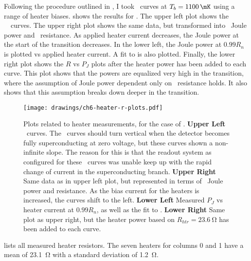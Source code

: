 Following the procedure outlined in , I took \IV\ curves at $T_b = \SI{1100}{\mK}$ using a range of heater biases.
 shows the results for .
The upper left plot shows the \TES\ \IV\ curves.
The upper right plot shows the same data, but transformed into \TES\ Joule power and \TES\ resistance.
As applied heater current decreases, the Joule power at the start of the transition decreases.
In the lower left, the Joule power at $0.99R_{n}$ is plotted vs applied heater current.
A fit to  is also plotted.
Finally, the lower right plot shows the $R$ vs $P_J$ plots after the heater power has been added to each curve.
This plot shows that the powers are equalized very high in the transition, where the assumption of Joule power dependent only on \TES\ resistance holds.
It also shows that this assumption breaks down deeper in the transition.

\begin{figure*}
\texttt{[image: drawings/ch6-heater-r-plots.pdf]}
\caption[Plots related to heater measurements]{
Plots related to heater measurements, for the case of .
\textbf{Upper Left} \IV\ curves. The \IV\ curves should turn vertical when the detector becomes fully superconducting at zero voltage, but these curves shown a non-infinite slope. The reason for this is that the readout system as configured for these \IV\ curves was unable keep up with the rapid change of current in the superconducting branch.
\textbf{Upper Right} Same data as in upper left plot, but represented in terms of \TES\ Joule power and resistance. As the bias current for the heaters is increased, the curves shift to the left.
\textbf{Lower Left} Measured $P_{J}$ vs heater current at $0.99R_n$, as well as the fit to .
\textbf{Lower Right} Same plot as upper right, but the heater power based on $R_{htr} = \SI{23.6}{\ohm}$ has been added to each curve.
}
\label{fig:ch6-heater-r-plots}
\end{figure*}

 lists all measured heater resistors.
The seven heaters for columns 0 and 1 have a mean of \SI{23.1}{\ohm} with a standard deviation of \SI{1.2}{\ohm}.

